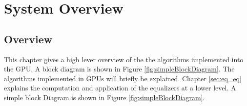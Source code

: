 

\chapter{System Overview}
\label{sec:systemOverview}

\section{Overview}
This chapter gives a high lever overview of the the algorithms implemented into the GPU.
A block diagram is shown in Figure \ref{fig:simpleBlockDiagram}.
The algorithms implemented in GPUs will briefly be explained.
Chapter \ref{sec:eq_eq} explains the computation and application of the equalizers at a lower level.
A simple block Diagram is shown in Figure \ref{fig:simpleBlockDiagram}.

